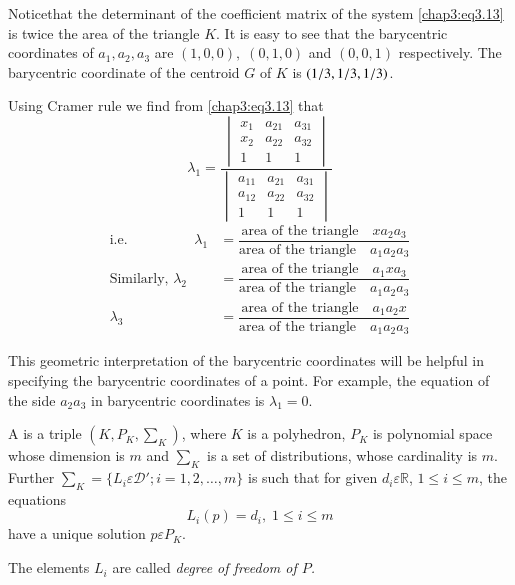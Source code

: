 Notice\pageoriginale that the determinant of the coefficient matrix of
the system \eqref{chap3:eq3.13} is twice the area of the triangle
$K$. It is easy to see that the barycentric coordinates of $a_1, a_2,
a_3$ are $(1, 0, 0), \; (0, 1, 0)$ and $(0, 0, 1)$ respectively. The
barycentric coordinate of the centroid $G$ of $K$ is $(1/3,\break 1/3,
1/3)$. 

Using Cramer rule we find from \eqref{chap3:eq3.13} that 
$$
\lambda_1=\dfrac
{\begin{vmatrix}
x_1 & a_{21} & a_{31}\\ 
x_2 & a_{22} & a_{32}\\ 
1 & 1 & 1
\end{vmatrix}}
{\begin{vmatrix}
a_{11} & a_{21} & a_{31}\\ 
a_{12} & a_{22} & a_{32}\\ 
1 & 1 & 1
\end{vmatrix}}
$$
\begin{align*}
\text{i.e.}\hspace{2cm} \lambda_1 &= \dfrac{\text{area of the triangle}
\quad xa_2a_3}{\text{area of the triangle}\quad a_1a_2a_3}\\
\text{Similarly, } \lambda_2 &= \dfrac{\text{area of the triangle}
  \quad a_1xa_3} {\text{area of the triangle}\quad a_1a_2a_3}\\
\lambda_3 &= \dfrac{\text{area of the triangle}\quad a_1a_2x}
{\text{area of the triangle}\quad a_1a_2a_3}
\end{align*}

This geometric interpretation of the barycentric coordinates will be
helpful in specifying the barycentric coordinates of a point. For
example, the equation of the side $a_2a_3$ in barycentric coordinates
is $\lambda_1=0$. 

\begin{def*}
A is a triple $(K, P_K, \sum_K)$, where 
$K$ is a polyhedron, $P_K$ is polynomial space whose dimension is $m$ and
$\sum_K$ is a set of distributions, whose cardinality is $m$. Further
$\sum_K=\{L_i \varepsilon\mathscr{D}';i=1, 2,\ldots,m\}$ is such that
for given $d_i\varepsilon\mathbb{R}$, $1\leq i\leq m$, the equations
$$
L_i(p)=d_i,\; 1\leq i \leq m
$$
have a unique solution $p\varepsilon P_K$.

\noindent The elements $L_i$ are called \emph{degree of freedom of $P$.}
\end{def*}

